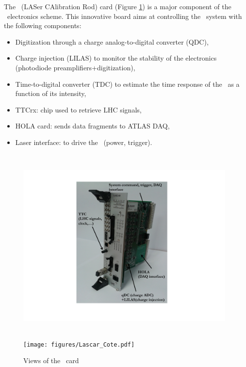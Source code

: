 The \lascar~(LASer CAlibration Rod) card (Figure \ref{fig:laslascar}) is a major component of the \lasii~electronics scheme. This innovative board aims at controlling the \las~system with the following components:
\begin{itemize}

\item Digitization through a charge analog-to-digital converter (QDC),

\item Charge injection (LILAS) to monitor the stability of the electronics (photodiode preamplifiers+digitization),

\item Time-to-digital converter (TDC) to estimate the time response of the \las~as a function of its intensity,

\item TTCrx: chip used to retrieve LHC signals,

\item HOLA card: sends data fragments to ATLAS DAQ,

\item Laser interface: to drive the \las~(power, trigger).

\end{itemize}

\begin{figure}[htbp]

\centering
\includegraphics[height=10cm,width=11cm]{figures/Lascar_photo_black.pdf}
\texttt{[image: figures/Lascar\_Cote.pdf]}
\caption{Views of the \lascar~card}\label{fig:laslascar}
\end{figure}

